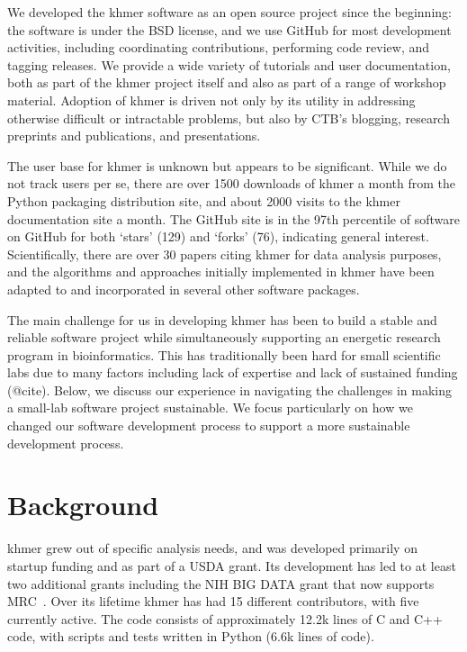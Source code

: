 \documentclass[12pt]{article}
\begin{document}
We developed the khmer software as an open source project since the
beginning: the software is under the BSD license, and we use GitHub
for most development activities, including coordinating contributions,
performing code review, and tagging releases.  We provide a wide
variety of tutorials and user documentation, both as part of the khmer
project itself and also as part of a range of workshop material.
Adoption of khmer is driven not only by its utility in addressing
otherwise difficult or intractable problems, but also by CTB's
blogging, research preprints and publications, and presentations.

The user base for khmer is unknown but appears to be significant.
While we do not track users per se, there are over 1500 downloads of
khmer a month from the Python packaging distribution site, and about
2000 visits to the khmer documentation site a month.  The GitHub site
is in the 97th percentile of software on GitHub for both `stars' (129)
and `forks' (76), indicating general interest.  Scientifically, there
are over 30 papers citing khmer for data analysis purposes, and the
algorithms and approaches initially implemented in khmer have been
adapted to and incorporated in several other software packages.

The main challenge for us in developing khmer has been to build a
stable and reliable software project while simultaneously supporting
an energetic research program in bioinformatics.  This has
traditionally been hard for small scientific labs due to many factors
including lack of expertise and lack of sustained funding (@cite).
Below, we discuss our experience in navigating the challenges in
making a small-lab software project sustainable.  We focus
particularly on how we changed our software development process to
support a more sustainable development process.

\section{Background}

khmer grew out of specific analysis needs, and was developed primarily
on startup funding and as part of a USDA grant.  Its development has
led to at least two additional grants including the NIH BIG DATA
grant that now supports MRC~\cite{brown2012bigdata}.  Over its lifetime
khmer has had 15 different contributors, with five currently active.
The code consists of approximately 12.2k lines of C and C++ code, with
scripts and tests written in Python (6.6k lines of code).
\end{document}
